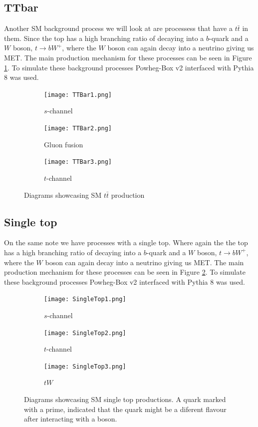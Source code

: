 \documentclass[14pt, a4paper]{book}
\begin{document}
\subsection{TTbar}
Another SM background process we will look at are processess that have a $t\bar{t}$ in them. Since the top has a high branching ratio of decaying into a $b$-quark and a $W$ boson, $t\rightarrow bW^+$, where the $W$ boson can again decay into a neutrino giving 
us MET. The main production mechanism for these processes can be seen in Figure \ref{fig:TT_BKG}. To simulate these background processes Powheg-Box v2 \cite{PowHeg} interfaced with Pythia 8 \cite{Pythia} was used.
\begin{figure}[!ht]
    \centering
    \begin{subfigure}[b]{0.3\textwidth}
        \centering
        \texttt{[image: TTBar1.png]}
        \caption{$s$-channel}
    \end{subfigure}
    \hfill
    \begin{subfigure}[b]{0.3\textwidth}
        \centering
        \texttt{[image: TTBar2.png]}
        \caption{Gluon fusion}
    \end{subfigure}
    \hfill
    \begin{subfigure}[b]{0.3\textwidth}
        \centering
        \texttt{[image: TTBar3.png]}
        \caption{$t$-channel}
    \end{subfigure}
    \caption[$t\bar{t}$ production]{Diagrams showcasing SM $t\bar{t}$ production}\label{fig:TT_BKG}
\end{figure}

\subsection{Single top}
On the same note we have processes with a single top. Where again the the top has a high branching ratio of decaying into a $b$-quark and a $W$ boson, $t\rightarrow bW^+$, where the $W$ boson can again decay into a neutrino giving 
us MET. The main production mechanism for these processes can be seen in Figure \ref{fig:T_BKG}. To simulate these background processes Powheg-Box v2 \cite{PowHeg} interfaced with Pythia 8 \cite{Pythia} was used.
\begin{figure}[!ht]
    \centering
    \begin{subfigure}[b]{0.3\textwidth}
        \centering
        \texttt{[image: SingleTop1.png]}
        \caption{$s$-channel}
    \end{subfigure}
    \hfill
    \begin{subfigure}[b]{0.3\textwidth}
        \centering
        \texttt{[image: SingleTop2.png]}
        \caption{$t$-channel}
    \end{subfigure}
    \hfill
    \begin{subfigure}[b]{0.3\textwidth}
        \centering
        \texttt{[image: SingleTop3.png]}
        \caption{$tW$}
    \end{subfigure}
    \caption[Single Top production]{Diagrams showcasing SM single top productions.  A quark marked with a prime, indicated that the quark might be a diferent flavour after interacting with a boson.}\label{fig:T_BKG}
\end{figure}
\end{document}
